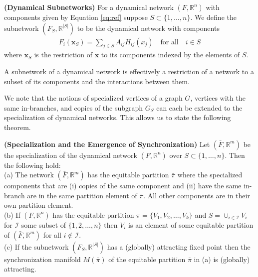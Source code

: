 \documentclass[12pt]{thesis}
\begin{document}
\begin{definition}\textbf{(Dynamical Subnetworks)}
For a dynamical network $(F,\mathbb{R}^n)$ with components given by Equation \eqref{eq:ref} suppose $S\subset\{1,\dots,n\}$.
We define the subnetwork $(F_S,\mathbb{R}^{|S|})$ to be the dynamical network with components
\begin{align*}
F_i(\mathbf{x}_S)=\sum_{j\in S}A_{ij}H_{ij}(x_j) \quad \text{for all} \quad i\in S
\end{align*}
where $\mathbf{x}_S$ is the restriction of $\mathbf{x}$ to its components indexed by the elements of $S$.
\end{definition}

\noindent A subnetwork of a dynamical network is effectively a restriction of a network to a subset of its components and the interactions between them.

We note that the notions of specialized vertices of a graph $G$, vertices with the same in-branches, and copies of the subgraph $G_S$ can each be extended to the specialization of dynamical networks.
This allows us to state the following theorem.

\begin{theorem}\textbf{(Specialization and the Emergence of Synchronization)}\label{thm:sync}
Let $(\bar{F},\mathbb{R}^m)$ be the specialization of the dynamical network $(F,\mathbb{R}^n)$ over $S\subset\{1,\dots,n\}$.
Then the following hold:\\ 
(a) The network $(\bar{F},\mathbb{R}^m)$ has the equitable partition $\bar{\pi}$ where the specialized components that are (i) copies of the same component and (ii) have the same in-branch are in the same partition element of $\bar{\pi}$.
All other components are in their own partition element.\\
(b) If $(F,\mathbb{R}^n)$ has the equitable partition $\pi=\{V_1,V_2,\dots,V_k\}$ and $S=\cup_{i\in\mathcal{I}}V_i$ for $\mathcal{I}$ some subset of $\{1,2,\dots,n\}$ then $V_i$ is an element of some equitable partition of $(\bar{F},\mathbb{R}^m)$ for all $i\notin\mathcal{I}$.\\
(c) If the subnetwork $(F_S,\mathbb{R}^{|S|})$ has a (globally) attracting fixed point then the synchronization manifold $M(\bar{\pi})$ of the equitable partition $\bar{\pi}$ in (a) is (globally) attracting.
\end{theorem}
\end{document}
